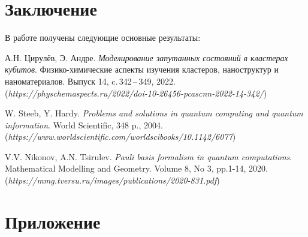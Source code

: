 \documentclass[a4paper]{report}
\begin{document}

\newpage
{}
\section*{Заключение}

В работе получены следующие основные результаты:


\newpage
{}

\begin{thebibliography}{99}

А.Н. Цирулёв, Э. Андре. \textit{Моделирование запутанных состояний в кластерах кубитов}. Физико-химические аспекты изучения кластеров, наноструктур и наноматериалов. Выпуск 14, c.\,342\,--\,349, 2022.\\
(\textit{https://physchemaspects.ru/2022/doi-10-26456-pcascnn-2022-14-342/})

W. Steeb, Y. Hardy. \textit{Problems and solutions in quantum computing and quantum information}. World Scientific, 348 p., 2004.\\
(\textit{https://www.worldscientific.com/worldscibooks/10.1142/6077})

V.V. Nikonov, A.N. Tsirulev. \textit{Pauli basis formalism in quantum computations}. Mathematical Modelling and Geometry. Volume 8, No 3, pp.1-14, 2020.\\
(\textit{https://mmg.tversu.ru/images/publications/2020-831.pdf})

\end{thebibliography}


\newpage
{}
\section*{Приложение}
\end{document}
